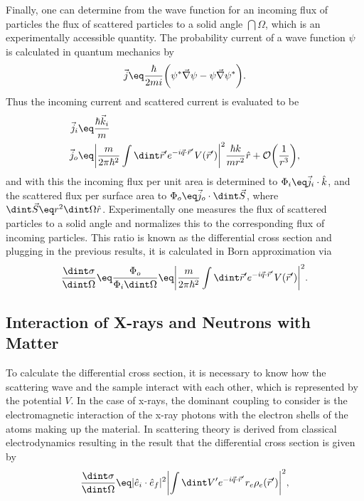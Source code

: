 \documentclass[\main/dresen_thesis.tex]{subfiles}
\begin{document}
Finally, one can determine from the wave function for an incoming flux of particles the flux of scattered particles to a solid angle $\dint \Omega$, which is an experimentally accessible quantity.  The probability current of a wave function $\psi$  is calculated in quantum mechanics by
\begin{align}
  \vec{j} \eq \frac{\hbar}{2mi} \bigg( \psi^* \vec{\nabla} \psi - \psi \vec{\nabla} \psi^* \bigg).
\end{align}
Thus the incoming current and scattered current is evaluated to be
\begin{align}
  \vec{j}_i &\eq \frac{\hbar \vec{k}_i}{m}\\
  \vec{j}_o &\eq \bigg| \frac{m}{2 \pi\hbar^2} \int \dint \vec{r}^\prime e^{-i\vec{q} \cdot \vec{r}^\prime} V (\vec{r}^\prime) \bigg|^2 \frac{\hbar k}{m r^2} \hat{r} + \mathcal{O} \bigg(\frac{1}{r^3}\bigg),\\
\end{align}
and with this the incoming flux per unit area is determined to $\Phi_i \eq \vec{j}_i \cdot \hat{k}$, and the scattered flux per surface area to $\Phi_o \eq \vec{j}_o \cdot \dint \vec{S}$, where $\dint \vec{S} \eq r^2 \dint \Omega \hat{r}$.
Experimentally one measures the flux of scattered particles to a solid angle and normalizes this to the corresponding flux of incoming particles. This ratio is known as the differential cross section and plugging in the previous results, it is calculated in Born approximation via
\begin{align}
  \frac{\dint \sigma}{\dint \Omega} \eq \frac{\Phi_o}{\Phi_i \dint \Omega} \eq \bigg| \frac{m}{2 \pi\hbar^2} \int \dint \vec{r}^\prime e^{-i\vec{q} \cdot \vec{r}^\prime} V (\vec{r}^\prime) \bigg|^2.
  \label{eq:theoreticalBackground:scattering:scatteringTheory:differentialCrossSectionBornApproximation}
\end{align}

\subsection{Interaction of X-rays and Neutrons with Matter}\label{sec:theoreticalBackground:scattering:interactionWithMatter}
To calculate the differential cross section, it is necessary to know how the scattering wave and the sample interact with each other, which is represented by the potential $V$.
In the case of x-rays, the dominant coupling to consider is the electromagnetic interaction of the x-ray photons with the electron shells of the atoms making up the material.
In  scattering theory is derived from classical electrodynamics resulting in the result that the differential cross section is given by
\begin{align}
  \frac{\dint \sigma}{\dint \Omega} \eq |\hat{e}_i \cdot \hat{e}_f|^2 \biggl|\int \dint V^\prime e^{-i \vec{q} \cdot \vec{r}^\prime}  r_e \rho_e (\vec{r}^\prime) \biggr|^2 ,
\end{align}
\end{document}
